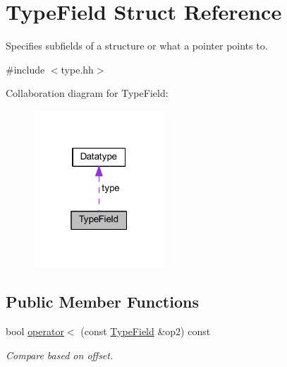 \hypertarget{struct_type_field}{}\section{Type\+Field Struct Reference}
\label{struct_type_field}


Specifies subfields of a structure or what a pointer points to.  




{\ttfamily \#include $<$type.\+hh$>$}



Collaboration diagram for Type\+Field\+:
\nopagebreak
\begin{figure}[H]
\begin{center}
\leavevmode
\includegraphics[width=139pt]{struct_type_field__coll__graph}
\end{center}
\end{figure}
\subsection*{Public Member Functions}
\begin{DoxyCompactItemize}
\item 
bool \mbox{\hyperlink{struct_type_field_a4680ac4ecd0d45094984c96e90054d05}{operator$<$}} (const \mbox{\hyperlink{struct_type_field}{Type\+Field}} \&op2) const
\begin{DoxyCompactList}\small\item\em Compare based on offset. \end{DoxyCompactList}\end{DoxyCompactItemize}
